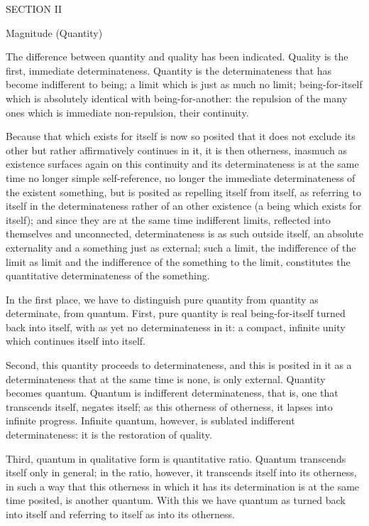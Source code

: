 SECTION II

Magnitude (Quantity)

The difference between quantity and quality has been indicated.
Quality is the first, immediate determinateness.
Quantity is the determinateness that has become indifferent to being;
a limit which is just as much no limit;
being-for-itself which is absolutely identical with being-for-another:
the repulsion of the many ones which is immediate non-repulsion,
their continuity.

Because that which exists for itself is now so posited
that it does not exclude its other
but rather affirmatively continues in it,
it is then otherness, inasmuch as
existence surfaces again on this continuity
and its determinateness is at the same time
no longer simple self-reference,
no longer the immediate determinateness of the existent something,
but is posited as repelling itself from itself,
as referring to itself in the determinateness
rather of an other existence
(a being which exists for itself);
and since they are at the same time indifferent limits,
reflected into themselves and unconnected,
determinateness is as such outside itself,
an absolute externality and a something just as external;
such a limit, the indifference of the limit as limit
and the indifference of the something to the limit,
constitutes the quantitative determinateness of the something.

In the first place, we have to distinguish pure quantity
from quantity as determinate, from quantum.
First, pure quantity is real being-for-itself
turned back into itself, with as yet no determinateness in it:
a compact, infinite unity which continues itself into itself.

Second, this quantity proceeds to determinateness,
and this is posited in it as a determinateness
that at the same time is none, is only external.
Quantity becomes quantum.
Quantum is indifferent determinateness,
that is, one that transcends itself, negates itself;
as this otherness of otherness, it lapses into infinite progress.
Infinite quantum, however, is sublated indifferent determinateness:
it is the restoration of quality.

Third, quantum in qualitative form is quantitative ratio.
Quantum transcends itself only in general;
in the ratio, however, it transcends itself into its otherness,
in such a way that this otherness in which it has its
determination is at the same time posited, is another quantum.
With this we have quantum as turned back into itself
and referring to itself as into its otherness.

